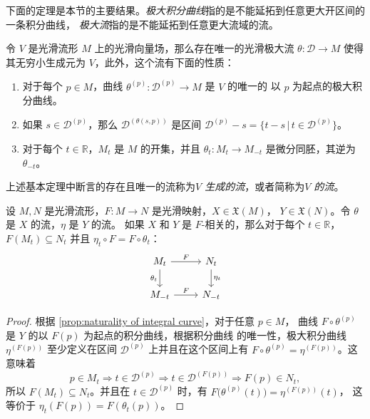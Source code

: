 \documentclass[fontset=none]{Notes}
\begin{document}
下面的定理是本节的主要结果。\emph{极大积分曲线}指的是不能延拓到任意更大开区间的一条积分曲线，
\emph{极大流}指的是不能延拓到任意更大流域的流。

\begin{theorem}[流的基本定理]
  令 $V$ 是光滑流形 $M$ 上的光滑向量场，那么存在唯一的光滑极大流 $\theta:\mathcal{D}\to M$
  使得其无穷小生成元为 $V$，此外，这个流有下面的性质：
  \begin{enumerate}
    \item 对于每个 $p\in M$，曲线 $\theta^{(p)}:\mathcal{D}^{(p)}\to M$ 是 $V$ 的唯一的
    以 $p$ 为起点的极大积分曲线。
    \item 如果 $s\in \mathcal{D}^{(p)}$，那么 $\mathcal{D}^{(\theta(s,p))}$ 是区间
    $\mathcal{D}^{(p)}-s=\{t-s\,|\, t\in \mathcal{D}^{(p)}\}$。
    \item 对于每个 $t\in \mathbb{R}$，$M_t$ 是 $M$ 的开集，并且 $\theta_t:M_t\to M_{-t}$
    是微分同胚，其逆为 $\theta_{-t}$。
  \end{enumerate}
\end{theorem}

上述基本定理中断言的存在且唯一的流称为\emph{$V$ 生成的流}，或者简称为\emph{$V$ 的流}。

\begin{proposition}[流的自然性]
  设 $M,N$ 是光滑流形，$F:M\to N$ 是光滑映射，$X\in \mathfrak{X}(M)$，
  $Y\in \mathfrak{X}(N)$。令 $\theta$ 是 $X$ 的流，$\eta$ 是 $Y$ 的流。
  如果 $X$ 和 $Y$ 是 $F$-相关的，那么对于每个 $t\in \mathbb{R}$，
  $F(M_t)\subseteq N_t$ 并且 $\eta_t\circ F=F\circ\theta_t$：
  \[
    \begin{tikzcd}
      M_t\arrow[r,"F"]\arrow[d,"\theta_t"'] & N_t\arrow[d,"\eta_t"]\\
      M_{-t}\arrow[r,"F"] & N_{-t}
    \end{tikzcd}  
  \]
\end{proposition} 
\begin{proof}
  根据 \autoref{prop:naturality of integral curve}，对于任意 $p\in M$，
  曲线 $F\circ\theta^{(p)}$ 是 $Y$ 的以 $F(p)$ 为起点的积分曲线，根据积分曲线
  的唯一性，极大积分曲线 $\eta^{(F(p))}$ 至少定义在区间 $\mathcal{D}^{(p)}$
  上并且在这个区间上有 $F\circ\theta^{(p)}=\eta^{(F(p))}$。这意味着
  \[
    p\in M_t\Rightarrow t\in \mathcal{D}^{(p)}  
    \Rightarrow t\in \mathcal{D}^{(F(p))}\Rightarrow F(p)\in N_t,
  \]
  所以 $F(M_t)\subseteq N_t$。并且在 $t\in \mathcal{D}^{(p)}$
  时，有 $F\bigl(\theta^{(p)}(t)\bigr)=\eta^{(F(p))}(t)$，
  这等价于 $\eta_t(F(p))=F(\theta_t(p))$。
\end{proof}
\end{document}
